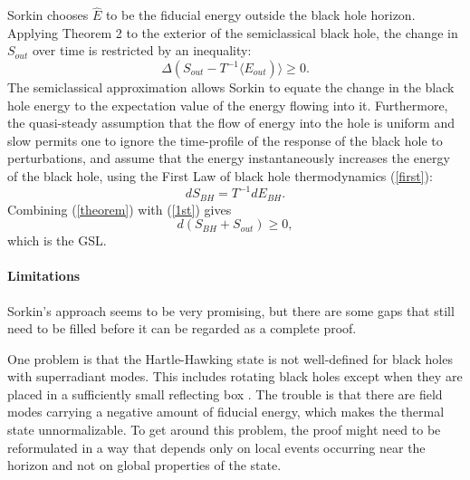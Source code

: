 \documentclass[12pt]{article}
\begin{document}
Sorkin chooses $\hat{E}$ to be the fiducial energy outside the black hole horizon.  Applying Theorem 2 to the exterior of the semiclassical black hole, the change in $S_{out}$ over time is restricted by an inequality:
\begin{equation}\label{theorem}
\Delta(S_{out} - T^{-1}\langle E_{out})\rangle \ge 0.
\end{equation}
The semiclassical approximation allows Sorkin to equate the change in the black hole energy to the expectation value of the energy flowing into it.  Furthermore, the quasi-steady assumption that the flow of energy into the hole is uniform and slow permits one to ignore the time-profile of the response of the black hole to perturbations, and assume that the energy instantaneously increases the energy of the black hole, using the First Law of black hole thermodynamics (\ref{first}):
\begin{equation}\label{1st}
dS_{BH} = T^{-1}dE_{BH}.
\end{equation}
Combining (\ref{theorem}) with (\ref{1st}) gives
\begin{equation}
d(S_{BH} + S_{out}) \ge 0,
\end{equation}
which is the GSL.
\paragraph{Limitations}
Sorkin's approach seems to be very promising, but there are some gaps that still need to be filled before it can be regarded as a complete proof.

One problem is that the Hartle-Hawking state is not well-defined for black holes with superradiant modes.  This includes rotating black holes except when they are placed in a sufficiently small reflecting box \cite{DO08}.  The trouble is that there are field modes carrying a negative amount of fiducial energy, which makes the thermal state unnormalizable.  To get around this problem, the proof might need to be reformulated in a way that depends only on local events occurring near the horizon and not on global properties of the state.
\end{document}
